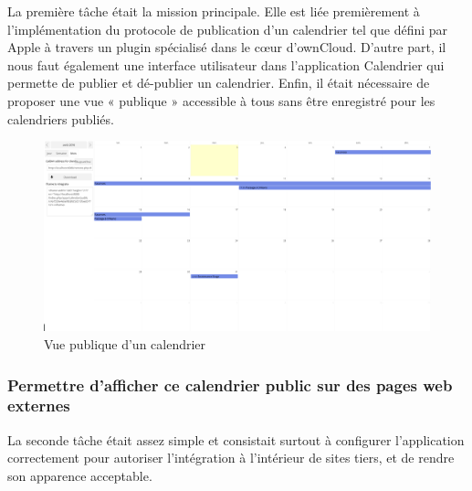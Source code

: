 \documentclass[10pt,a4paper]{report}
\begin{document}
	La première tâche était la mission principale. Elle est liée premièrement à l'implémentation du protocole de publication d'un calendrier tel que défini par Apple à travers un plugin spécialisé dans le cœur d'ownCloud. D'autre part, il nous faut également une interface utilisateur dans l'application Calendrier qui permette de publier et dé-publier un calendrier. Enfin, il était nécessaire de proposer une vue « publique » accessible à tous sans être enregistré pour les calendriers publiés.

	\begin{figure}[ht]
		\centering
		\includegraphics[width=1.25\textwidth]{images/calendrier-vue-publique.png}
		\caption*{Vue publique d'un calendrier}
		\label{normal_case}
	\end{figure}

	
	\subsubsection{Permettre d'afficher ce calendrier public sur des pages web externes}La seconde tâche était assez simple et consistait surtout à configurer l'application correctement pour autoriser l'intégration à l'intérieur de sites tiers, et de rendre son apparence acceptable.
	
\end{document}
